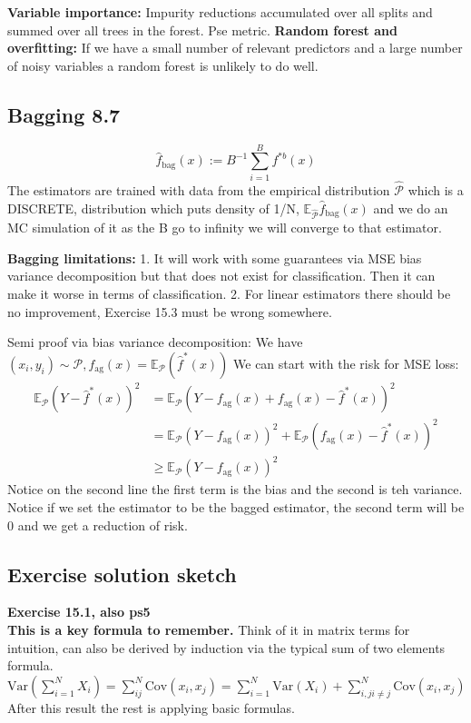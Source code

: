 \documentclass{article}
\begin{document}
\textbf{Variable importance:}
Impurity reductions accumulated over all splits and summed over all trees in the forest. Pse metric.
\textbf{Random forest and overfitting:}
If we have a small number of relevant predictors and a large number of noisy variables a random forest is unlikely to do well.

\subsection*{Bagging 8.7}
$$\hat{f}_{\text{bag}}(x) := B^{-1} \sum_{i=1}^{B} f^{*b}(x)$$
The estimators are trained with data from the empirical distribution $\hat{\mathcal{P}}$ which is a DISCRETE, distribution which puts 
density of 1/N, $\mathbb{E}_{\hat{\mathcal{P}}}\hat{f}_{\text{bag}}(x) $ and we do an MC simulation of it as the B go to infinity we will converge to that estimator. 

\textbf{Bagging limitations:} 1. It will work with some guarantees via MSE bias variance decomposition but that does not exist for classification. 
Then it can make it worse in terms of classification. 2. For linear estimators there should be no improvement, Exercise 15.3 must be wrong somewhere. 

Semi proof via bias variance decomposition: We have $(x_i,y_i) \sim \mathcal{P}, f_{\text{ag}}(x) = \mathbb{E}_{\mathcal{P}}(\hat{f}^*(x)) $
We can start with the risk for MSE loss: 
\begin{align*}
    \mathbb{E}_{\mathcal{P}}(Y- \hat{f}^*(x))^2 &=  \mathbb{E}_{\mathcal{P}}(Y - f_{\text{ag}}(x) + f_{\text{ag}}(x) - \hat{f}^*(x))^2 \\
         & = \mathbb{E}_{\mathcal{P}}(Y - f_{\text{ag}}(x))^2 +\mathbb{E}_{\mathcal{P}}( f_{\text{ag}}(x) - \hat{f}^*(x))^2 \\
         &\geq \mathbb{E}_{\mathcal{P}}(Y - f_{\text{ag}}(x))^2
\end{align*}
Notice on the second line the first term is the bias and the second is teh variance. 
Notice if we set the estimator to be the bagged estimator, the second term will be 0 and we get a reduction of risk.      

\subsection*{Exercise solution sketch}
\textbf{Exercise 15.1, also ps5}\\
\textbf{This is a key formula to remember.} Think of it in matrix terms for intuition, can also be 
derived by induction via the typical sum of two elements formula.
\noindent
$\text{Var}(\sum_{i=1}^{N}X_i) = \sum_{ij}^{N} \text{Cov}(x_i, x_j) = \sum_{i=1}^{N}\text{Var}(X_i) + \sum_{i,j i\neq j}^{N}\text{Cov}(x_i,x_j)$
After this result the rest is applying basic formulas. 
\end{document}

